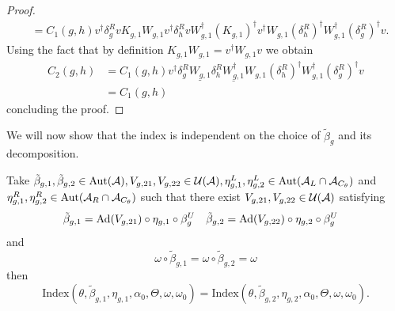 \documentclass[12pt,a4paper,twoside]{article}
\numberwithin{equation}{section}
\begin{document}
\begin{proof}
\begin{align}
		&=C_1(g,h)v^\dagger \delta_g^R v K_{g,1} W_{g,1}v^\dagger \delta_h^R v W_{g,1}^\dagger (K_{g,1})^\dagger v^\dagger W_{g,1}(\delta^R_h)^\dagger W_{g,1}^\dagger(\delta_g^R)^\dagger v.
	\end{align}
	Using the fact that by definition $K_{g,1}W_{g,1}=v^\dagger W_{g,1}v$ we obtain
	\begin{align}
		C_2(g,h)&=C_1(g,h)v^\dagger \delta_g^R \underline{W_{g,1}} \delta_h^R \underline{W_{g,1}^\dagger} W_{g,1}(\delta^R_h)^\dagger W_{g,1}^\dagger(\delta_g^R)^\dagger v\\
		&=C_1(g,h)
	\end{align}
	concluding the proof.
\end{proof}
We will now show that the index is independent on the choice of $\tilde{\beta}_g$ and its decomposition.
\begin{lemma}\label{lem:InvarianceUnderChoiceBeta}
	Take $\tilde{\beta}_{g,1},\tilde{\beta}_{g,2}\in\Aut{\AA},V_{g,21},V_{g,22}\in\UU(\AA),\eta_{g,1}^L,\eta_{g,2}^L\in \Aut{\AA_L\cap\AA_{C_\theta}}$ and $\eta_{g,1}^R,\eta_{g,2}^R\in \Aut{\AA_R\cap\AA_{C_\theta}}$ such that there exist $V_{g,21},V_{g,22}\in\mathcal U(\mathcal A)$ satisfying
	\begin{align}\label{eq:InvarianceUnderChoiceBetaTwoBetas}
		\tilde{\beta}_{g,1}&=\Ad{V_{g,21}}\circ\eta_{g,1}\circ\beta^U_g&\tilde{\beta}_{g,2}&=\Ad{V_{g,22}}\circ\eta_{g,2}\circ\beta^U_g
	\end{align}
	and
	\begin{equation}
		\omega\circ\tilde{\beta}_{g,1}=\omega\circ\tilde{\beta}_{g,2}=\omega
	\end{equation}
	then
	\begin{equation}
		\textrm{Index}(\theta,\tilde{\beta}_{g,1},\eta_{g,1},\alpha_{0},\Theta,\omega,\omega_0)=\textrm{Index}(\theta,\tilde{\beta}_{g,2},\eta_{g,2},\alpha_{0},\Theta,\omega,\omega_0).
	\end{equation}
\end{lemma}
\end{document}
